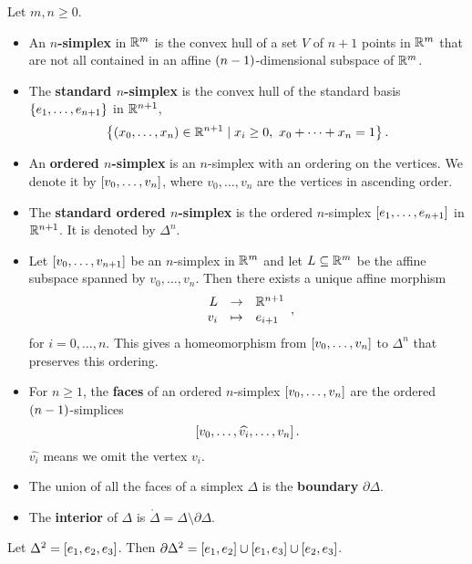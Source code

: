 \begin{definition*}
Let $ m, n \ge 0 $.
\begin{itemize}
\item An \textbf{$ n $-simplex} in $ \R^m $ is the convex hull of a set $ V $ of $ n + 1 $ points in $ \R^m $ that are not all contained in an affine $ \rb{n - 1} $-dimensional subspace of $ \R^m $.
\item The \textbf{standard $ n $-simplex} is the convex hull of the standard basis $ \cb{e_1, \dots, e_{n + 1}} $ in $ \R^{n + 1} $,
$$ \cb{\rb{x_0, \dots, x_n} \in \R^{n + 1} \mid x_i \ge 0, \ x_0 + \dots + x_n = 1}. $$
\item An \textbf{ordered $ n $-simplex} is an $ n $-simplex with an ordering on the vertices. We denote it by $ \sb{v_0, \dots, v_n} $, where $ v_0, \dots, v_n $ are the vertices in ascending order.
\item The \textbf{standard ordered $ n $-simplex} is the ordered $ n $-simplex $ \sb{e_1, \dots, e_{n + 1}} $ in $ \R^{n + 1} $. It is denoted by $ \Delta^n $.
\item Let $ \sb{v_0, \dots, v_{n + 1}} $ be an $ n $-simplex in $ \R^m $ and let $ L \subseteq \R^m $ be the affine subspace spanned by $ v_0, \dots, v_n $. Then there exists a unique affine morphism
$$ \function{L}{\R^{n + 1}}{v_i}{e_{i + 1}}, $$
for $ i = 0, \dots, n $. This gives a homeomorphism from $ \sb{v_0, \dots, v_n} $ to $ \Delta^n $ that preserves this ordering.
\item For $ n \ge 1 $, the \textbf{faces} of an ordered $ n $-simplex $ \sb{v_0, \dots, v_n} $ are the ordered $ \rb{n - 1} $-simplices
$$ \sb{v_0, \dots, \widehat{v_i}, \dots, v_n}. $$
$ \widehat{v_i} $ means we omit the vertex $ v_i $.
\item The union of all the faces of a simplex $ \Delta $ is the \textbf{boundary} $ \partial\Delta $.
\item The \textbf{interior} of $ \Delta $ is $ \mathring{\Delta} = \Delta \setminus \partial\Delta $.
\end{itemize}
\end{definition*}

\begin{example*}
Let $ \Delta^2 = \sb{e_1, e_2, e_3} $. Then $ \partial\Delta^2 = \sb{e_1, e_2} \cup \sb{e_1, e_3} \cup \sb{e_2, e_3} $.
\end{example*}

